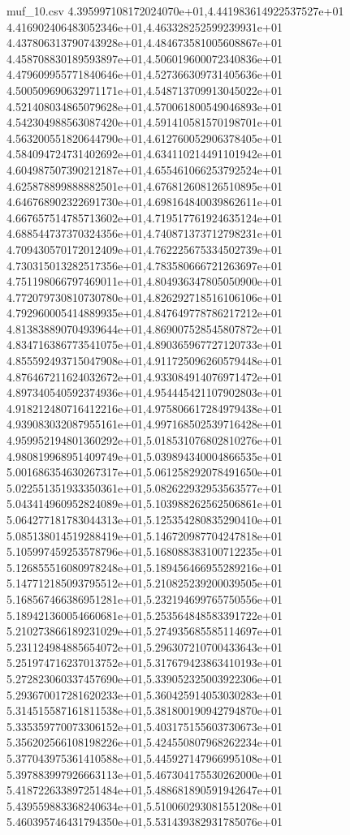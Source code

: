 \begin{filecontents*}{muf_10.csv}
4.395997108172024070e+01,4.441983614922537527e+01
4.416902406483052346e+01,4.463328252599239931e+01
4.437806313790743928e+01,4.484673581005608867e+01
4.458708830189593897e+01,4.506019600072340836e+01
4.479609955771840646e+01,4.527366309731405636e+01
4.500509690632971171e+01,4.548713709913045022e+01
4.521408034865079628e+01,4.570061800549046893e+01
4.542304988563087420e+01,4.591410581570198701e+01
4.563200551820644790e+01,4.612760052906378405e+01
4.584094724731402692e+01,4.634110214491101942e+01
4.604987507390212187e+01,4.655461066253792524e+01
4.625878899888882501e+01,4.676812608126510895e+01
4.646768902322691730e+01,4.698164840039862611e+01
4.667657514785713602e+01,4.719517761924635124e+01
4.688544737370324356e+01,4.740871373712798231e+01
4.709430570172012409e+01,4.762225675334502739e+01
4.730315013282517356e+01,4.783580666721263697e+01
4.751198066797469011e+01,4.804936347805050900e+01
4.772079730810730780e+01,4.826292718516106106e+01
4.792960005414889935e+01,4.847649778786217212e+01
4.813838890704939644e+01,4.869007528545807872e+01
4.834716386773541075e+01,4.890365967727120733e+01
4.855592493715047908e+01,4.911725096260579448e+01
4.876467211624032672e+01,4.933084914076971472e+01
4.897340540592374936e+01,4.954445421107902803e+01
4.918212480716412216e+01,4.975806617284979438e+01
4.939083032087955161e+01,4.997168502539716428e+01
4.959952194801360292e+01,5.018531076802810276e+01
4.980819968951409749e+01,5.039894340004866535e+01
5.001686354630267317e+01,5.061258292078491650e+01
5.022551351933350361e+01,5.082622932953563577e+01
5.043414960952824089e+01,5.103988262562506861e+01
5.064277181783044313e+01,5.125354280835290410e+01
5.085138014519288419e+01,5.146720987704247818e+01
5.105997459253578796e+01,5.168088383100712235e+01
5.126855516080978248e+01,5.189456466955289216e+01
5.147712185093795512e+01,5.210825239200039505e+01
5.168567466386951281e+01,5.232194699765750556e+01
5.189421360054660681e+01,5.253564848583391722e+01
5.210273866189231029e+01,5.274935685585114697e+01
5.231124984885654072e+01,5.296307210700433643e+01
5.251974716237013752e+01,5.317679423863410193e+01
5.272823060337457690e+01,5.339052325003922306e+01
5.293670017281620233e+01,5.360425914053030283e+01
5.314515587161811538e+01,5.381800190942794870e+01
5.335359770073306152e+01,5.403175155603730673e+01
5.356202566108198226e+01,5.424550807968262234e+01
5.377043975361410588e+01,5.445927147966995108e+01
5.397883997926663113e+01,5.467304175530262000e+01
5.418722633897251484e+01,5.488681890591942647e+01
5.439559883368240634e+01,5.510060293081551208e+01
5.460395746431794350e+01,5.531439382931785076e+01

\end{filecontents*}
